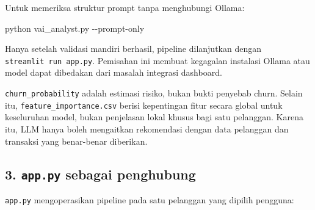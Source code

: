\documentclass[
  indonesian,
  letterpaper,
  DIV=11,
  numbers=noendperiod]{scrreprt}
\newenvironment{Shaded}{\begin{snugshade}}{\end{snugshade}}
\newcommand{\AttributeTok}[1]{\textcolor[rgb]{0.40,0.45,0.13}{#1}}
\newcommand{\ExtensionTok}[1]{\textcolor[rgb]{0.00,0.23,0.31}{#1}}
\newcommand{\NormalTok}[1]{\textcolor[rgb]{0.00,0.23,0.31}{#1}}
\begin{document}
Untuk memeriksa struktur prompt tanpa menghubungi Ollama:

\begin{Shaded}
\begin{Highlighting}[]
\ExtensionTok{python}\NormalTok{ vai\_analyst.py }\AttributeTok{{-}{-}prompt{-}only}
\end{Highlighting}
\end{Shaded}

Hanya setelah validasi mandiri berhasil, pipeline dilanjutkan dengan
\texttt{streamlit\ run\ app.py}. Pemisahan ini membuat kegagalan
instalasi Ollama atau model dapat dibedakan dari masalah integrasi
dashboard.

\begin{tcolorbox}[enhanced jigsaw, arc=.35mm, bottomrule=.15mm, bottomtitle=1mm, breakable, colback=white, colbacktitle=quarto-callout-note-color!10!white, colframe=quarto-callout-note-color-frame, coltitle=black, left=2mm, leftrule=.75mm, opacityback=0, opacitybacktitle=0.6, rightrule=.15mm, title=\textcolor{quarto-callout-note-color}{\faInfo}\hspace{0.5em}{Prediksi tidak sama dengan penjelasan sebab-akibat}, titlerule=0mm, toprule=.15mm, toptitle=1mm]

\texttt{churn\_probability} adalah estimasi risiko, bukan bukti penyebab
churn. Selain itu, \texttt{feature\_importance.csv} berisi kepentingan
fitur secara global untuk keseluruhan model, bukan penjelasan lokal
khusus bagi satu pelanggan. Karena itu, LLM hanya boleh mengaitkan
rekomendasi dengan data pelanggan dan transaksi yang benar-benar
diberikan.

\end{tcolorbox}

\subsection{\texorpdfstring{3. \texttt{app.py} sebagai
penghubung}{3. app.py sebagai penghubung}}\label{app.py-sebagai-penghubung}

\texttt{app.py} mengoperasikan pipeline pada satu pelanggan yang dipilih
pengguna:
\end{document}
